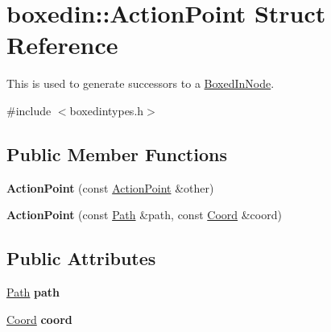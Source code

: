 \hypertarget{structboxedin_1_1ActionPoint}{\section{boxedin\+:\+:Action\+Point Struct Reference}
\label{structboxedin_1_1ActionPoint}
}


This is used to generate successors to a \hyperlink{classboxedin_1_1BoxedInNode}{Boxed\+In\+Node}.  




{\ttfamily \#include $<$boxedintypes.\+h$>$}

\subsection*{Public Member Functions}
\begin{DoxyCompactItemize}
\item 
\hypertarget{structboxedin_1_1ActionPoint_aea725dc865006eb188ee926f800c909d}{{\bfseries Action\+Point} (const \hyperlink{structboxedin_1_1ActionPoint}{Action\+Point} \&other)}\label{structboxedin_1_1ActionPoint_aea725dc865006eb188ee926f800c909d}

\item 
\hypertarget{structboxedin_1_1ActionPoint_ad35aef0e170bd2e362671997e5bfe712}{{\bfseries Action\+Point} (const \hyperlink{namespaceboxedin_ab79d3e8d943aa2875e3adb42b8917ff7}{Path} \&path, const \hyperlink{namespaceboxedin_afc0dedc740afcefb60a4dac20d984b16}{Coord} \&coord)}\label{structboxedin_1_1ActionPoint_ad35aef0e170bd2e362671997e5bfe712}

\end{DoxyCompactItemize}
\subsection*{Public Attributes}
\begin{DoxyCompactItemize}
\item 
\hypertarget{structboxedin_1_1ActionPoint_a7faa5662e0bb5ed0c6800dc7174a9740}{\hyperlink{namespaceboxedin_ab79d3e8d943aa2875e3adb42b8917ff7}{Path} {\bfseries path}}\label{structboxedin_1_1ActionPoint_a7faa5662e0bb5ed0c6800dc7174a9740}

\item 
\hypertarget{structboxedin_1_1ActionPoint_a1e64684985df47d2c6246657e8b8aff8}{\hyperlink{namespaceboxedin_afc0dedc740afcefb60a4dac20d984b16}{Coord} {\bfseries coord}}\label{structboxedin_1_1ActionPoint_a1e64684985df47d2c6246657e8b8aff8}

\end{DoxyCompactItemize}
